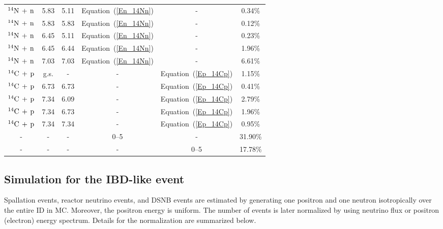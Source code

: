 \begin{table}[h]
\begin{tabular}{cccccc}
		$^{14}{\rm N}\,+\,{\rm n}$ & 5.83          & 5.11          & Equation~(\ref{En_14Nn}) & -                        & 0.34\%      \\
		$^{14}{\rm N}\,+\,{\rm n}$ & 5.83          & 5.83          & Equation~(\ref{En_14Nn}) & -                        & 0.12\%      \\
		$^{14}{\rm N}\,+\,{\rm n}$ & 6.45          & 5.11          & Equation~(\ref{En_14Nn}) & -                        & 0.23\%      \\
		$^{14}{\rm N}\,+\,{\rm n}$ & 6.45          & 6.44          & Equation~(\ref{En_14Nn}) & -                        & 1.96\%      \\
		$^{14}{\rm N}\,+\,{\rm n}$ & 7.03          & 7.03          & Equation~(\ref{En_14Nn}) & -                        & 6.61\%      \\
		$^{14}{\rm C}\,+\,{\rm p}$ & g.s.          & -             & -                        & Equation~(\ref{Ep_14Cp}) & 1.15\%      \\
		$^{14}{\rm C}\,+\,{\rm p}$ & 6.73          & 6.73          & -                        & Equation~(\ref{Ep_14Cp}) & 0.41\%      \\
		$^{14}{\rm C}\,+\,{\rm p}$ & 7.34          & 6.09          & -                        & Equation~(\ref{Ep_14Cp}) & 2.79\%      \\
		$^{14}{\rm C}\,+\,{\rm p}$ & 7.34          & 6.73          & -                        & Equation~(\ref{Ep_14Cp}) & 1.96\%      \\
		$^{14}{\rm C}\,+\,{\rm p}$ & 7.34          & 7.34          & -                        & Equation~(\ref{Ep_14Cp}) & 0.95\%      \\
		-                          & -             & -             & 0--5                     & -                        & 31.90\%     \\
		-                          & -             & -             & -                        & 0--5                     & 17.78\%     \\ \hline \hline
	\end{tabular}
\end{table}





\clearpage
\subsection{Simulation for the IBD-like event}
\vs\hs
Spallation events, reactor neutrino events, and DSNB events are estimated by generating one positron and one neutron isotropically over the entire ID in MC.
Moreover, the positron energy is uniform.
The number of events is later normalized by using neutrino flux or positron (electron) energy spectrum.
Details for the normalization are summarized below.

